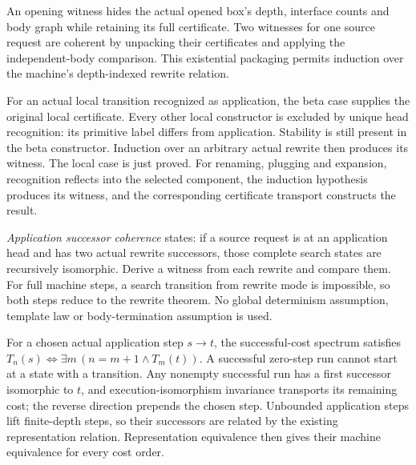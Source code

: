 An opening witness hides the actual opened box's depth, interface counts and
body graph while retaining its full certificate. Two witnesses for one source
request are coherent by unpacking their certificates and applying the
independent-body comparison. This existential packaging permits induction over
the machine's depth-indexed rewrite relation.



For an actual local transition recognized as application, the beta case
supplies the original local certificate. Every other local constructor is
excluded by unique head recognition: its primitive label differs from
application. Stability is still present in the beta constructor.
Induction over an arbitrary actual rewrite then produces its witness. The
local case is just proved. For renaming, plugging and expansion, recognition
reflects into the selected component, the induction hypothesis produces its
witness, and the corresponding certificate transport constructs the result.



\emph{Application successor coherence} states: if a source request is at an
application head and has two actual rewrite successors, those complete search
states are recursively isomorphic. Derive a witness from each rewrite and
compare them. For full machine steps, a search transition from rewrite mode is
impossible, so both steps reduce to the rewrite theorem. No global determinism
assumption, template law or body-termination assumption is used.



For a chosen actual application step $s\to t$, the successful-cost spectrum
satisfies $T_n(s)\iff\exists m\,(n=m+1\land T_m(t))$. A successful zero-step
run cannot start at a state with a transition. Any nonempty successful run
has a first successor isomorphic to $t$, and execution-isomorphism invariance
transports its remaining cost; the reverse direction prepends the chosen step.
Unbounded application steps lift finite-depth steps, so their successors are
related by the existing representation relation. Representation equivalence
then gives their machine equivalence for every cost order.


